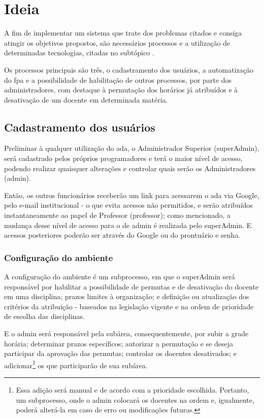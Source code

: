 \chapter{Ideia}

A fim de implementar um sistema que trate dos problemas citados e consiga atingir os objetivos propostos, são necessários processos e a utilização de determinadas tecnologias, citadas no subtópico . 

Os processos principais são três, o cadastramento dos usuários, a automatização do \ac{fpa} e a possibilidade de habilitação de outros processos, por parte dos administradores, com destaque à permutação dos horários já atribuídos e à desativação de um docente em determinada matéria.

\section{Cadastramento dos usuários}

Preliminar à qualquer utilização do \ac{ada}, o Administrador Superior (\gls{superAdmin}), será cadastrado pelos próprios programadores e terá o maior nível de acesso, podendo realizar quaisquer alterações e controlar quais serão os Administradores (\gls{admin}). 

Então, os outros funcionários receberão um link para acessarem o \ac{ada} via Google, pelo e-mail institucional - o que evita acessos não permitidos, e serão atribuídos instantaneamente ao papel de Professor (\gls{professor}); como mencionado, a mudança desse nível de acesso para o de \gls{admin} é realizada pelo \gls{superAdmin}. E acessos posteriores poderão ser através do Google ou do prontuário e senha.

\subsection{Configuração do ambiente}

A configuração do ambiente é um subprocesso, em que o \gls{superAdmin} será responsável por habilitar a possibilidade de \glspl{permuta} e de desativação do docente em uma disciplina; prazos limites à organização; e definição ou atualização dos critérios da atribuição - baseados na legislação vigente e na ordem de prioridade de escolha das disciplinas.

E o \gls{admin} será responsável pela subárea, consequentemente, por subir a grade horária; determinar prazos específicos; autorizar a \gls{permutação} e se deseja participar da aprovação das \glspl{permuta}; controlar os docentes desativados; e adicionar\footnote{Essa adição será manual e de acordo com a prioridade escolhida. Portanto, um subprocesso, onde o \gls{admin} colocará os docentes na ordem e, igualmente, poderá alterá-la em caso de erro ou modificações futuras.} os que participarão de sua subárea. 


